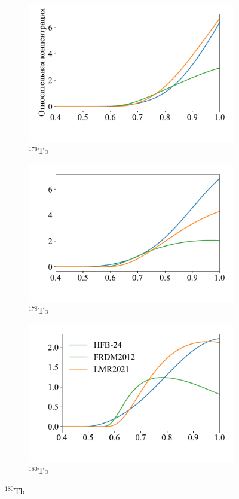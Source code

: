 \begin{figure}
  \centering
  \begin{subfigure}{0.32\textwidth}
    \centering
    \includegraphics[width=\textwidth]{pics/y_65_176.pdf}
    \caption{${}^{176}$Tb}
  \end{subfigure}
  \hfill
  \begin{subfigure}{0.32\textwidth}
    \centering
    \includegraphics[width=\textwidth]{pics/y_65_178.pdf}
    \caption{${}^{178}$Tb}
  \end{subfigure}
  \hfill
  \begin{subfigure}{0.32\textwidth}
    \centering
    \includegraphics[width=\textwidth]{pics/y_65_180.pdf}
    \caption{${}^{180}$Tb}
  \end{subfigure}
  

\end{figure}
